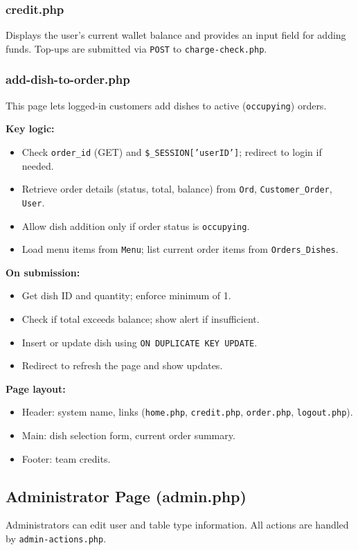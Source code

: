 \documentclass[12pt]{article}
\begin{document}
\subsubsection{credit.php}
Displays the user's current wallet balance and provides an input field for adding funds.  
Top-ups are submitted via \texttt{POST} to \texttt{charge-check.php}.

\subsubsection{add-dish-to-order.php}

This page lets logged-in customers add dishes to active (\texttt{occupying}) orders.

\textbf{Key logic:}
\begin{itemize}
    \item Check \texttt{order\_id} (GET) and \texttt{\$\_SESSION['userID']}; redirect to login if needed.
    \item Retrieve order details (status, total, balance) from \texttt{Ord}, \texttt{Customer\_Order}, \texttt{User}.
    \item Allow dish addition only if order status is \texttt{occupying}.
    \item Load menu items from \texttt{Menu}; list current order items from \texttt{Orders\_Dishes}.
\end{itemize}

\textbf{On submission:}
\begin{itemize}
    \item Get dish ID and quantity; enforce minimum of 1.
    \item Check if total exceeds balance; show alert if insufficient.
    \item Insert or update dish using \texttt{ON DUPLICATE KEY UPDATE}.
    \item Redirect to refresh the page and show updates.
\end{itemize}

\textbf{Page layout:}
\begin{itemize}
    \item Header: system name, links (\texttt{home.php}, \texttt{credit.php}, \texttt{order.php}, \texttt{logout.php}).
    \item Main: dish selection form, current order summary.
    \item Footer: team credits.
\end{itemize}

\subsection{Administrator Page (admin.php)}
Administrators can edit user and table type information. All actions are handled by \texttt{admin-actions.php}.
\end{document}
